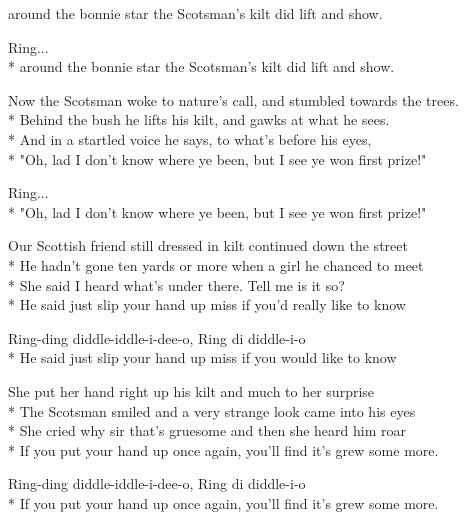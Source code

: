 \begin{SongText}
\begin{SongVerse}
around the bonnie star the Scotsman's kilt did lift and show.
\end{SongVerse}
\begin{SongVerse}
Ring...\\*%
around the bonnie star the Scotsman's kilt did lift and show. 
\end{SongVerse}
\begin{SongVerse}
Now the Scotsman woke to nature's call, and stumbled towards the trees.\\*%
Behind the bush he lifts his kilt, and gawks at what he sees.\\*%
And in a startled voice he says, to what's before his eyes,\\*%
"Oh, lad I don't know where ye been, but I see ye won first prize!"
\end{SongVerse}
\begin{SongVerse}
Ring...\\*%
"Oh, lad I don't know where ye been, but I see ye won first prize!"
\end{SongVerse}
\begin{SongVerse}
Our Scottish friend still dressed in kilt continued down the street\\*%
He hadn't gone ten yards or more when a girl he chanced to meet\\*%
She said I heard what's under there. Tell me is it so?\\*%
He said just slip your hand up miss if you'd really like to know
\end{SongVerse}
\begin{SongVerse}
Ring-ding diddle-iddle-i-dee-o, Ring di diddle-i-o\\*%
He said just slip your hand up miss if you would like to know
\end{SongVerse}
\begin{SongVerse}
She put her hand right up his kilt and much to her surprise\\*%
The Scotsman smiled and a very strange look came into his eyes\\*%
She cried why sir that’s gruesome and then she heard him roar\\*%
If you put your hand up once again, you'll find it's grew some more.
\end{SongVerse}
\begin{SongVerse}
Ring-ding diddle-iddle-i-dee-o, Ring di diddle-i-o\\*%
If you put your hand up once again, you'll find it's grew some more.
\end{SongVerse}
\end{SongText}
